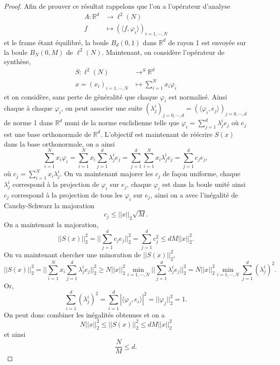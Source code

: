 \begin{proof}
	Afin de prouver ce résultat rappelons que l'on a l'opérateur d'analyse
	\begin{align}
		A :	\mathbb{R}^d &\longrightarrow \ell^2(N)\\
			f &\longmapsto (\langle f, \varphi_i \rangle)_{i=1,\cdots, N}
	\end{align}
	et le frame étant équilibré, la boule $B_d(0,1)$ dans $\mathbb{R}^d$ de rayon 1 est envoyée sur la boule $B_N(0,M)$ de $\ell^2(N)$.
	Maintenant, on considère l'opérateur de synthèse,
	\begin{align}
		S :	\ell^2(N) &\longrightarrow^S \mathbb{R}^d\\
			x=(x_i)_{i=1, \cdots, N} &\longmapsto \sum_{i=1}^N x_i \varphi_i
	\end{align}
	et on considère, sans perte de généralité que chaque $\varphi_i$ est normalisé. Ainsi chaque à chaque $\varphi_i$, on peut associer une suite $(\lambda_j^i)_{j=0, \cdots, d}=(\langle \varphi_i, e_j\rangle)_{j=0,\cdots, d}$ de norme 1 dans $\mathbb{R}^d$ muni de la norme euclidienne telle que $\varphi_i = \sum_{j=1}^d \lambda_j^i e_j$ où $e_j$ est une base orthonormale de $\mathbb{R}^d$. 
	L'objectif est maintenant de réécrire $S(x)$ dans la base orthonormale, on a ainsi
	\begin{equation}
		\sum_{i=1}^N x_i \varphi_i = \sum_{i=1}^N x_i \sum_{j=1}^d \lambda_j^i e_j = \sum_{j=1}^d \sum_{i=1}^N x_i \lambda_j^ie_j =\sum_{j=1}^d c_j e_j,
	\end{equation}
	où $c_j = \sum_{i=1}^Nx_i\lambda_j^i$. On va maintenant majorer les $c_j$ de façon uniforme, chaque $\lambda_j^i$ correspond à la projection de $\varphi_i$ sur $e_j$, chaque $\varphi_i$ est dans la boule unité ainsi $c_j$ correspond à la projection de tous les $\varphi_i$ sur $e_j$, ainsi on a avec l'inégalité de Cauchy-Schwarz la majoration
	\begin{equation}
		c_j \leq ||x||_2 \sqrt{M}.
	\end{equation}
	On a maintenant la majoration,
	\begin{equation}
		||S (x)||^2_2 = ||\sum_{j=1}^d c_j e_j||_2^2= \sum_{j=1}^d c_j^2 \leq d M||x||_2^2. 
	\end{equation}
	On va maintenant chercher une minoration de $||S(x)||_2^2$,
	\begin{equation}
		||S(x)||_2^2 = ||\sum_{i=1}^N x_i \sum_{j=1}^d \lambda_j^i e_j||_2^2 \geq N||x||_2^2 \min_{i=1, \cdots, N} ||\sum_{j=1}^d \lambda_j^i e_j||_2^2 = N||x||_2^2 \min_{i=1, \cdots, N}\sum_{j=1}^d (\lambda_j^i)^2.
	\end{equation}
	Or,
	\begin{equation}
		\sum_{i=1}^d (\lambda_j^i)^2 = \sum_{i=1}^d |\langle \varphi_j, e_i \rangle|^2 =||\varphi_j||_2^2=1.  
	\end{equation}
	On peut donc combiner les inégalités obtenues et on a
	\begin{equation}
		N ||x||_2^2 \leq ||S(x)||_2^2 \leq d M||x||_2^2
	\end{equation}
	et ainsi
	\begin{equation}
		\frac{N}{M} \leq d.
	\end{equation}
\end{proof}
